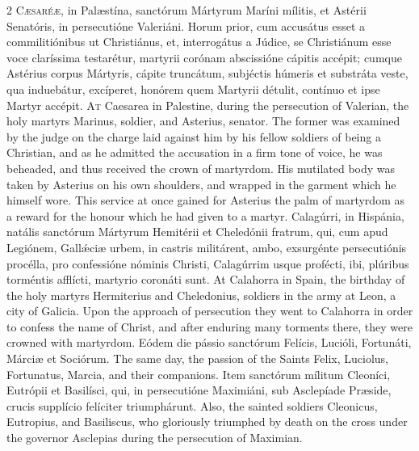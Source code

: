 \begin{paracol}{2}
\lettrine[lines=2]{C}{æsaréæ,} in Palæstína, sanctórum Mártyrum 
 Maríni mílitis, et Astérii Senatóris, in persecutióne Valeriáni. Horum 
 prior, cum accusátus esset a commilitiónibus ut Christiánus, et, 
 interrogátus a Júdice, se Christiánum esse voce claríssima testarétur, 
 martyrii corónam abscissióne cápitis accépit; cumque Astérius corpus 
 Mártyris, cápite truncátum, subjéctis húmeris et substráta veste, qua 
 induebátur, excíperet, honórem quem Martyrii détulit, contínuo et ipse 
 Martyr accépit.
\switchcolumn
{}
\lettrine[lines=2]{A}{t} Caesarea in Palestine, during the persecution of Valerian, the holy 
 martyrs Marinus, soldier, and Asterius, senator. The former was 
 examined by the judge on the charge laid against him by his fellow soldiers 
 of being a Christian, and as he admitted the accusation in a firm tone of 
 voice, he was beheaded, and thus received the crown of martyrdom. His 
 mutilated body was taken by Asterius on his own shoulders, and wrapped in 
 the garment which he himself wore. This service at once gained for 
 Asterius the palm of martyrdom as a reward for the honour which he had given 
 to a martyr.
\switchcolumn*
{}
Calagúrri, in Hispánia, natális sanctórum Mártyrum Hemitérii et Cheledónii 
 fratrum, qui, cum apud Legiónem, Gallǽciæ 
 urbem, in castris militárent, ambo, exsurgénte persecutiónis procélla, pro 
 confessióne nóminis Christi, Calagúrrim usque profécti, ibi, plúribus 
 torméntis afflícti, martyrio coronáti sunt.
\switchcolumn
{}
At Calahorra in Spain, the birthday of the holy martyrs Hermiterius and 
 Cheledonius, soldiers in the army at Leon, a city of Galicia. Upon the 
 approach of persecution they went to Calahorra in order to confess the name 
 of Christ, and after enduring many torments there, they were crowned with 
 martyrdom.
\switchcolumn*
{}
Eódem die pássio sanctórum Felícis, Lucióli, Fortunáti, Márciæ 
 et Sociórum.
\switchcolumn
{}
The same day, the passion of the Saints Felix, Luciolus, Fortunatus, Marcia, 
 and their companions.
\switchcolumn*
{}
Item sanctórum mílitum Cleoníci, Eutrópii et 
 Basilísci, qui, in persecutióne Maximiáni, sub Asclepíade Præside, crucis 
 supplício felíciter triumphárunt.
\switchcolumn
{}
Also, the sainted soldiers Cleonicus, Eutropius, and Basiliscus, who 
 gloriously triumphed by death on the cross under the governor Asclepias 
 during the persecution of Maximian.

\end{paracol}
